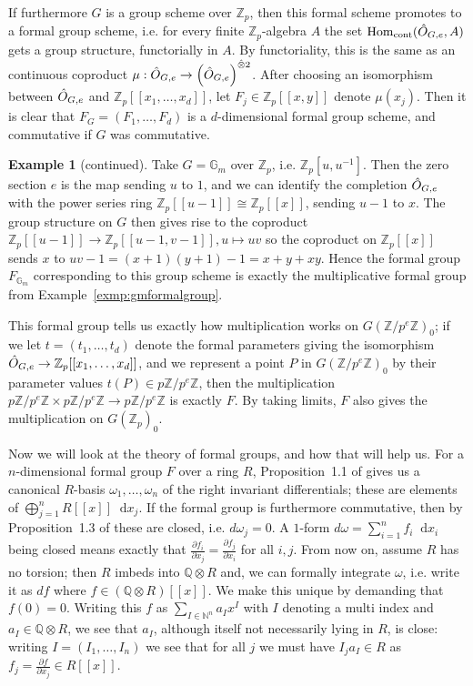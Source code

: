 \documentclass[12pt]{article}
\newcommand{\N}{\mathbb{N}}
\newcommand{\Z}{\mathbb{Z}}
\renewcommand{\G}{\mathbb{G}}
\newcommand{\Q}{\mathbb{Q}}
\newcommand*\diff{\mathop{}\!\mathrm{d}}
\newcommand{\tensor}{\otimes}
\DeclareMathOperator{\Hom}{Hom}
\theoremstyle{plain}
\theoremstyle{definition}
\newtheorem{exmp}[thm]{Example} %
\theoremstyle{remark}
\begin{document}
If furthermore $G$ is a group scheme over $\Z_p$, then this formal scheme promotes to a formal group scheme, i.e. for every finite $\Z_p$-algebra $A$ the set $\Hom_{\text{cont}}(\Hat{O}_{G,e},A)$ gets a group structure, functorially in $A$. By functoriality, this is the same as an continuous coproduct $\mu: \Hat{O}_{G,e} \to \left(\Hat{O}_{G,e}\right)^{\Hat{\tensor} 2}$. After choosing an isomorphism between $\Hat{O}_{G,e}$ and $\Z_p[[x_1,\dots,x_d]]$, let $F_j \in \Z_p[[x,y]]$ denote $\mu(x_j)$. Then it is clear that $F_G = (F_1,\dots,F_d)$ is a $d$-dimensional formal group scheme, and commutative if $G$ was commutative.
\addtocounter{thm}{-3}
\begin{exmp}[continued]
\label{exmp:gmtoformal}
Take $G = \G_m$ over $\Z_p$, i.e. $\Z_p[u,u^{-1}]$. Then the zero section $e$ is the map sending $u$ to $1$, and we can identify the completion $\Hat{O}_{G,e}$ with the power series ring $\Z_p[[u-1]] \cong \Z_p[[x]]$, sending $u-1$ to $x$. The group structure on $G$ then gives rise to the coproduct $\Z_p[[u-1]] \to \Z_p[[u-1,v-1]], u \mapsto uv$ so the coproduct on $\Z_p[[x]]$ sends $x$ to $uv-1 = (x+1)(y+1) -1 = x + y + xy$. Hence the formal group $F_{\G_m}$ corresponding to this group scheme is exactly the multiplicative formal group from Example~\ref{exmp:gmformalgroup}.
\end{exmp}

This formal group tells us exactly how multiplication works on $G(\Z/p^e\Z)_0$; if we let $t = (t_1,\dots,t_d)$ denote the formal parameters giving the isomorphism $\Hat{O}_{G,e} \to \Z_p[[x_1,\dots,x_d]]$, and we represent a point $P$ in $G(\Z/p^e\Z)_0$ by their parameter values $t(P) \in p\Z/p^e\Z$, then the multiplication $p\Z/p^e\Z \times p\Z/p^e\Z \to p\Z/p^e\Z$ is exactly $F$. By taking limits, $F$ also gives the multiplication on $G(\Z_p)_0$.

Now we will look at the theory of formal groups, and how that will help us. For a $n$-dimensional formal group $F$ over a ring $R$, Proposition~1.1 of \citep{honda70} gives us a canonical $R$-basis $\omega_1,\dots,\omega_n$ of the right invariant differentials; these are elements of $\bigoplus_{j=1}^n R[[x]] \diff x_j$. If the formal group is furthermore commutative, then by Proposition~1.3 of \citep{honda70} these are closed, i.e. $d\omega_j = 0$. A $1$-form $d\omega = \sum_{i=1}^n f_i \diff x_i$ being closed means exactly that $\frac{\partial f_i}{\partial x_j} = \frac{\partial f_j}{\partial x_i}$ for all $i,j$. From now on, assume $R$ has no torsion; then $R$ imbeds into $\Q \tensor R$ and, we can formally integrate $\omega$, i.e. write it as $df$ where $f \in (\Q\tensor R)[[x]]$. We make this unique by demanding that $f(0) = 0$. Writing this $f$ as $\sum_{I \in \N^n} a_I x^I$ with $I$ denoting a multi index and $a_I \in \Q\tensor R$, we see that $a_I$, although itself not necessarily lying in $R$, is close: writing $I = (I_1,\dots,I_n)$ we see that for all $j$ we must have $I_j a_I \in R$ as $f_j = \frac{\partial f}{\partial x_j} \in R[[x]]$.
\end{document}
